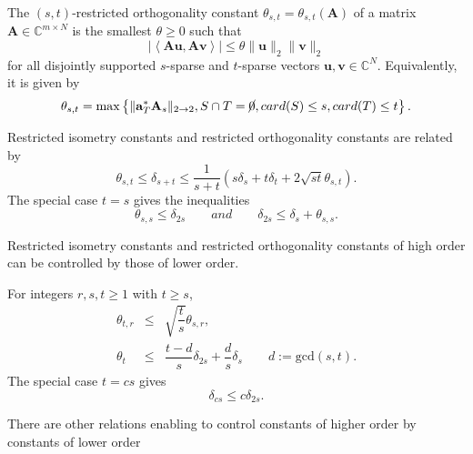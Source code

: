 \begin{definition}
    \label{def2.4}
    The $(s,t)$-restricted orthogonality constant $\theta_{s,t} = \theta_{s,t}(\mathbf{A})$ of a matrix $\mathbf{A} \in \mathbb{C}^{m \times N}$ is the smallest $\theta \geq 0$ such that
    \begin{equation}
        \label{eq2.4}
        \left|\left<\mathbf{Au}, \mathbf{Av}\right>\right| \leq \theta \|\mathbf{u}\|_2 \|\mathbf{v}\|_2
    \end{equation}
    for all disjointly supported $s$-sparse and $t$-sparse vectors $\mathbf{u,v} \in \mathbb{C}^N$. Equivalently, it is given by 
    \begin{equation}
        \label{eq2.5}
        \theta_{s,t} = \max\left\{\|\mathbf{a}_T^*\mathbf{A}_s\|_{2 \rightarrow 2}, S \cap T = \cancel{0}, card(S) \leq s, card(T) \leq t\right\}.
    \end{equation}
\end{definition}

\begin{proposition}
    \label{pr2.5}
    Restricted isometry constants and restricted orthogonality constants are related by
    \begin{equation*}
        \theta_{s,t} \leq \delta_{s+t} \leq \dfrac{1}{s+t}(s\delta_s + t\delta_t +2 \sqrt{st}\theta_{s,t}).
    \end{equation*}
    The special case $t=s$ gives the inequalities
    \begin{equation*}
        \theta_{s,s} \leq \delta_{2s} \qquad and \qquad \delta_{2s} \leq \delta_s + \theta_{s,s}.
    \end{equation*}
\end{proposition}

Restricted isometry constants and restricted orthogonality constants of high order can be controlled by those of lower order.
\begin{proposition}
    \label{pr2.6}
    For integers $r,s,t \geq 1$ with $t \geq s$,
    \begin{eqnarray*}
        \theta_{t,r} &\leq& \sqrt{\dfrac{t}{s}}\theta_{s,r}, \\
    \theta_t &\leq& \dfrac{t-d}{s}\delta_{2s} + \dfrac{d}{s} \delta_s \qquad d:= \text{gcd}(s,t).
    \end{eqnarray*}
    The special case $t= cs$ gives 
    \[
        \delta_{cs} \leq c \delta_{2s}.
    \]
\end{proposition}
\begin{remark}
    \label{rmk2.7}
    There are other relations enabling to control constants of higher order by constants of lower order
\end{remark}

